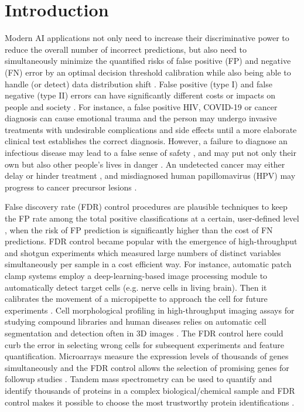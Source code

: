 \documentclass[10pt,letterpaper]{article}
\begin{document}
\section*{Introduction}
Modern AI applications not only need to increase their discriminative power to reduce the overall number of incorrect predictions, but also need to simultaneously minimize the quantified risks of false positive (FP) and negative (FN) error by an optimal decision threshold calibration while also being able to handle (or detect) data distribution shift \cite{feng2022clinical, al2023artificial}.
False positive (type I) and false negative (type II) errors can have significantly different costs or impacts on people and society \cite{wynants2019three}.
For instance, a false positive HIV, COVID-19 or cancer diagnosis can cause emotional trauma and the person may undergo invasive treatments with undesirable complications and side effects \cite{newman2021rate, salz2010meta, Tosteson2014Consequences, xu2016frequency} until a more elaborate clinical test establishes the correct diagnosis.
However, a failure to diagnose an infectious disease may lead to a false sense of safety \cite{mouliou2021false}, and may put not only their own but also other people's lives in danger \cite{woloshin2020false}.
An undetected cancer may either delay or hinder treatment \cite{bradley2021interpreting}, and misdiagnosed human papillomavirus (HPV) may progress to cancer precursor lesions \cite{macios2022false,pinsky2015principles}. 


False discovery rate (FDR) control procedures are plausible techniques to keep the FP rate among the total positive classifications at a certain, user-defined level \cite{Benjamini1995Controlling}, when the risk of FP prediction is significantly higher than the cost of FN predictions.
FDR control became popular with the emergence of high-throughput and shotgun experiments which measured large numbers of distinct variables simultaneously per sample in a cost efficient way.
For instance, automatic patch clamp systems employ a deep-learning-based image processing module to automatically detect target cells (e.g. nerve cells in living brain).
Then it calibrates the movement of a micropipette to approach the cell for future experiments \cite{koos2021automatic}.
Cell morphological profiling in high-throughput imaging assays for studying compound libraries and human diseases \cite{moshkov2024learning} relies on automatic cell segmentation and detection often in 3D images \cite{falk2019u}.
The FDR control here could curb the error in selecting wrong cells for subsequent experiments and feature quantification.
Microarrays measure the expression levels of thousands of genes simultaneously and the FDR control allows the selection of promising genes for followup studies \cite{storey2002direct,storey2003statistical,barber2015controlling}.
Tandem mass spectrometry can be used to quantify and identify thousands of proteins in a complex biological/chemical sample and FDR control makes it possible to choose the most trustworthy protein identifications \cite{elias2007target}.
\end{document}
